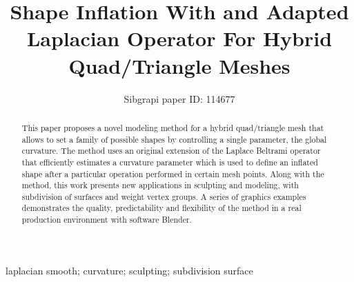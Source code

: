 \documentclass[10pt, conference]{IEEEtran}
\begin{document}
\title{Shape Inflation With and Adapted Laplacian Operator For Hybrid Quad/Triangle Meshes}

\newif\iffinal
\finalfalse
\newcommand{\jemsid}{114677}

\iffinal
  \author{%
    \IEEEauthorblockN{Alexander Pinzon, Eduardo Romero}
    \IEEEauthorblockA{%
      Cimalab Research Group\\
      Universidad Nacional de Colombia\\
      Bogota-Colombia\\
      Email: apinzonf@unal.edu.co, edromero@unal.edu.co }
  }
\else
  \author{Sibgrapi paper ID: \jemsid \\ }
\fi


\maketitle

\begin{abstract}
This paper proposes a novel modeling method for a hybrid quad/triangle
mesh that allows to set a family of possible shapes by controlling
a single parameter, the global curvature. The method uses an original
extension of the Laplace Beltrami operator that efficiently estimates
a curvature parameter which is used to define an inflated shape after
a particular operation performed in certain mesh points. Along with
the method, this work presents new applications in sculpting and modeling,
with subdivision of surfaces and weight vertex groups. A series of
graphics examples demonstrates the quality, predictability and flexibility
of the method in a real production environment with software Blender.

\end{abstract}

\begin{IEEEkeywords}
laplacian smooth; curvature; sculpting; subdivision surface

\end{IEEEkeywords}
\end{document}
